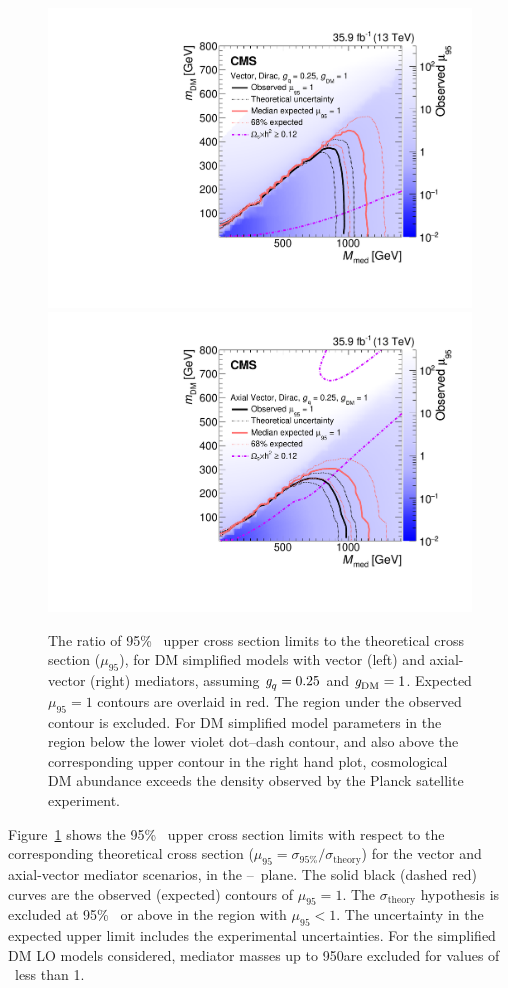\begin{figure}[htbp]
  \centering
   \includegraphics[width=0.48\linewidth]{Analysis/Figures/limits_vector.pdf}
    \includegraphics[width=0.48\linewidth]{Analysis/Figures/limits_axial.pdf}
    \caption{
      The ratio of 95\% \CL\ upper cross section limits to the theoretical cross section ($\mu_{95}$), for DM simplified models with vector (left) and axial-vector (right) mediators, assuming $\gq=0.25$ and $\gDM=1$.
      Expected $\mu_{95} = 1$ contours are overlaid in red. 
      The region under the observed contour is excluded. For DM simplified model parameters in the region below the lower violet dot--dash contour, and also above the corresponding upper contour in the right hand plot, cosmological DM abundance exceeds the density observed by the Planck satellite experiment.
    }
    \label{fig:limits}
\end{figure}

Figure~\ref{fig:limits} shows the 95\% \CL\ upper cross section limits with respect to the corresponding theoretical cross section ($\mu_{95}= \sigma_{95\%}/\sigma_{\text{theory}}$) for the  vector and axial-vector mediator scenarios, in the \mmed--\mdm\ plane. 
The solid black (dashed red) curves are the observed (expected) contours of $\mu_{95} = 1$. 
The $\sigma_{\text{theory}}$ hypothesis is excluded at 95\% \CL\ or above in the region with $\mu_{95} < 1$. 
The uncertainty in the expected upper limit includes the experimental uncertainties. 
For the simplified DM LO models considered, mediator masses up to 950\GeV are excluded for values of \mdm\ less than 1\GeV.
